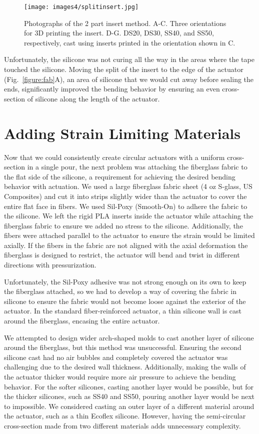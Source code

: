 \begin{figure}[ht!]
    \centering
    \texttt{[image: images4/splitinsert.jpg]}
    \caption{Photographs of the 2 part insert method. A-C. Three orientations for 3D printing the insert. D-G. DS20, DS30, SS40, and SS50, respectively, cast using inserts printed in the orientation shown in C.}
    \label{fig:splitinsert}
\end{figure}

Unfortunately, the silicone was not curing all the way in the areas where the tape touched the silicone. Moving the split of the insert to the edge of the actuator (Fig.~\ref{figure:fab}A), an area of silicone that we would cut away before sealing the ends, significantly improved the bending behavior by ensuring an even cross-section of silicone along the length of the actuator. 

\clearpage
\section{Adding Strain Limiting Materials}

Now that we could consistently create circular actuators with a uniform cross-section in a single pour, the next problem was attaching the fiberglass fabric to the flat side of the silicone, a requirement for achieving the desired bending behavior with actuation. We used a large fiberglass fabric sheet (4 oz S-glass, US Composites) and cut it into strips slightly wider than the actuator to cover the entire flat face in fibers. We used Sil-Poxy (Smooth-On) to adhere the fabric to the silicone. We left the rigid PLA inserts inside the actuator while attaching the fiberglass fabric to ensure we added no stress to the silicone. Additionally, the fibers were attached parallel to the actuator to ensure the strain would be limited axially. If the fibers in the fabric are not aligned with the axial deformation the fiberglass is designed to restrict, the actuator will bend and twist in different directions with pressurization. 

Unfortunately, the Sil-Poxy adhesive was not strong enough on its own to keep the fiberglass attached, so we had to develop a way of covering the fabric in silicone to ensure the fabric would not become loose against the exterior of the actuator. In the standard fiber-reinforced actuator, a thin silicone wall is cast around the fiberglass, encasing the entire actuator. 

We attempted to design wider arch-shaped molds to cast another layer of silicone around the fiberglass, but this method was unsuccessful. Ensuring the second silicone cast had no air bubbles and completely covered the actuator was challenging due to the desired wall thickness. Additionally, making the walls of the actuator thicker would require more air pressure to achieve the bending behavior. For the softer silicones, casting another layer would be possible, but for the thicker silicones, such as SS40 and SS50, pouring another layer would be next to impossible. We considered casting an outer layer of a different material around the actuator, such as a thin Ecoflex silicone. However, having the semi-circular cross-section made from two different materials adds unnecessary complexity. 


